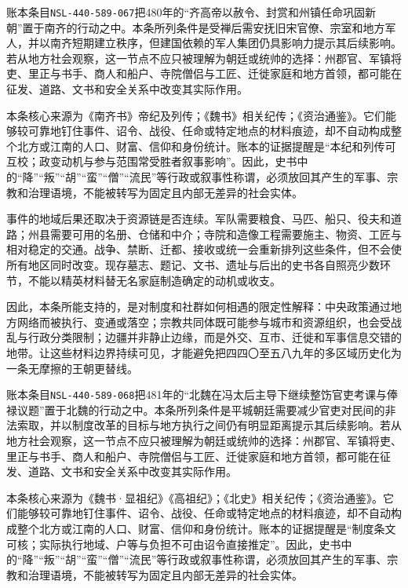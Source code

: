 账本条目\texttt{NSL-440-589-067}把480年的“齐高帝以赦令、封赏和州镇任命巩固新朝”置于南齐的行动之中。本条所列条件是受禅后需安抚旧宋官僚、宗室和地方军人，并以南齐短期建立秩序，但建国依赖的军人集团仍具影响力提示其后续影响。若从地方社会观察，这一节点不应只被理解为朝廷或统帅的选择：州郡官、军镇将吏、里正与书手、商人和船户、寺院僧侣与工匠、迁徙家庭和地方首领，都可能在征发、道路、文书和安全关系中改变其实际作用。

本条核心来源为《南齐书》帝纪及列传；《魏书》相关纪传；《资治通鉴》。它们能够较可靠地钉住事件、诏令、战役、任命或特定地点的材料痕迹，却不自动构成整个北方或江南的人口、财富、信仰和身份统计。账本的证据提醒是“本纪和列传可互校；政变动机与参与范围常受胜者叙事影响”。因此，史书中的“降”“叛”“胡”“蛮”“僧”“流民”等行政或叙事性称谓，必须放回其产生的军事、宗教和治理语境，不能被转写为固定且内部无差异的社会实体。

事件的地域后果还取决于资源链是否连续。军队需要粮食、马匹、船只、役夫和道路；州县需要可用的名册、仓储和中介；寺院和造像工程需要施主、物资、工匠与相对稳定的交通。战争、禁断、迁都、接收或统一会重新排列这些条件，但不会使所有地区同时改变。现存墓志、题记、文书、遗址与后出的史书各自照亮少数环节，不能以精英材料替无名家庭制造确定的动机或收支。

因此，本条所能支持的，是对制度和社群如何相遇的限定性解释：中央政策通过地方网络而被执行、变通或落空；宗教共同体既可能参与城市和资源组织，也会受战乱与行政分类限制；边疆并非静止边缘，而是外交、互市、迁徙和军事信息交错的地带。让这些材料边界持续可见，才能避免把四四〇至五八九年的多区域历史化为一条无摩擦的王朝更替线。

账本条目\texttt{NSL-440-589-068}把481年的“北魏在冯太后主导下继续整饬官吏考课与俸禄议题”置于北魏的行动之中。本条所列条件是平城朝廷需要减少官吏对民间的非法索取，并以制度改革的目标与地方执行之间仍有明显距离提示其后续影响。若从地方社会观察，这一节点不应只被理解为朝廷或统帅的选择：州郡官、军镇将吏、里正与书手、商人和船户、寺院僧侣与工匠、迁徙家庭和地方首领，都可能在征发、道路、文书和安全关系中改变其实际作用。

本条核心来源为《魏书·显祖纪》《高祖纪》；《北史》相关纪传；《资治通鉴》。它们能够较可靠地钉住事件、诏令、战役、任命或特定地点的材料痕迹，却不自动构成整个北方或江南的人口、财富、信仰和身份统计。账本的证据提醒是“制度条文可核；实际执行地域、户等与负担不可由诏令直接推定”。因此，史书中的“降”“叛”“胡”“蛮”“僧”“流民”等行政或叙事性称谓，必须放回其产生的军事、宗教和治理语境，不能被转写为固定且内部无差异的社会实体。

